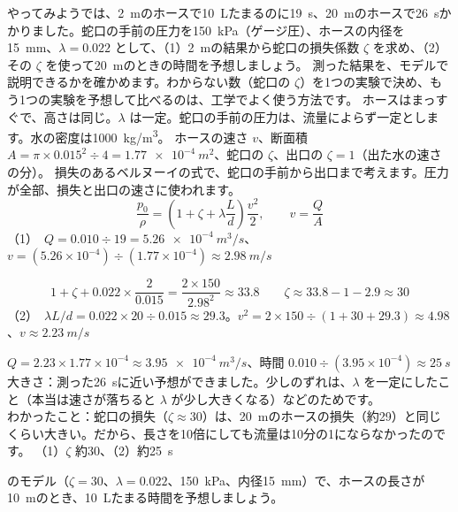 \begin{phreidai}\label{ph:力-14:ex12}
やってみようでは、\qty{2}{m}のホースで\qty{10}{L}たまるのに\qty{19}{s}、\qty{20}{m}のホースで\qty{26}{s}かかりました。蛇口の手前の圧力を\qty{150}{kPa}（ゲージ圧）、ホースの内径を\qty{15}{mm}、$\lambda=0.022$ として、（1）\qty{2}{m}の結果から蛇口の損失係数 $\zeta$ を求め、（2）その $\zeta$ を使って\qty{20}{m}のときの時間を予想しましょう。
\phbamen
測った結果を、モデルで説明できるかを確かめます。わからない数（蛇口の $\zeta$）を1つの実験で決め、もう1つの実験を予想して比べるのは、工学でよく使う方法です。
\phmushi
ホースはまっすぐで、高さは同じ。$\lambda$ は一定。蛇口の手前の圧力は、流量によらず一定とします。水の密度は\qty{1000}{kg/m^3}。
\phzu
ホースの速さ $v$、断面積 $A=\pi\times0.015^2\div 4=\qty{1.77e-4}{m^2}$、蛇口の $\zeta$、出口の $\zeta=1$（出た水の速さの分）。
\phriyu
損失のあるベルヌーイの式で、蛇口の手前から出口まで考えます。圧力が全部、損失と出口の速さに使われます。
\phtateru
\[\frac{p_0}{\rho}=\left(1+\zeta+\lambda\frac{L}{d}\right)\frac{v^2}{2},\qquad v=\frac{Q}{A}\]
\phtoku
（1）\nobreak\ $Q=0.010\div 19=\qty{5.26e-4}{m^3/s}$、$v=(5.26\times10^{-4})\div (1.77\times10^{-4})\approx\qty{2.98}{m/s}$\par
\[1+\zeta+0.022\times\frac{2}{0.015}=\frac{2\times150}{2.98^2}\approx33.8\qquad\zeta\approx33.8-1-2.9\approx30\]
（2）\nobreak\ $\lambda L/d=0.022\times 20\div 0.015\approx29.3$。$v^2=2\times150\div (1+30+29.3)\approx4.98$、$v\approx\qty{2.23}{m/s}$\par
$Q=2.23\times1.77\times10^{-4}\approx\qty{3.95e-4}{m^3/s}$、時間 $0.010\div (3.95\times10^{-4})\approx\qty{25}{s}$
\phtashikame
大きさ：測った\qty{26}{s}に近い予想ができました。少しのずれは、$\lambda$ を一定にしたこと（本当は速さが落ちると $\lambda$ が少し大きくなる）などのためです。\\
わかったこと：蛇口の損失（$\zeta\approx30$）は、\qty{20}{m}のホースの損失（約29）と同じくらい大きい。だから、長さを10倍にしても流量は10分の1にならなかったのです。
\kotae （1）$\zeta$ 約30、（2）約\qty{25}{s}
\end{phreidai}
\begin{jibun}
のモデル（$\zeta=30$、$\lambda=0.022$、\qty{150}{kPa}、内径\qty{15}{mm}）で、ホースの長さが\qty{10}{m}のとき、\qty{10}{L}たまる時間を予想しましょう。
\end{jibun}

